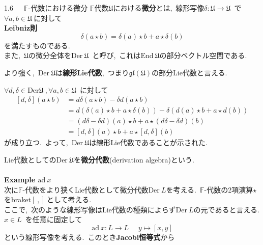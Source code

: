 \documentclass[uplatex,dvipdfmx]{jsarticle}
\begin{document}
\begin{mydef}{1.6~~~$\mathbb{F}$-代数における微分}
    $\mathbb{F}$代数$\mathfrak{U}$における\textbf{微分}とは,~線形写像$\delta:\mathfrak{U}\to \mathfrak{U}$~で$\forall a,b\in \mathfrak{U}~$に対して\\
    \textbf{Leibniz則}
    \begin{equation*}
        \delta(a\star b)=\delta(a)\star b+a\star \delta(b)
    \end{equation*}
    を満たすものである.\\
    また,~$\mathfrak{U}$の微分全体を$\text{Der}~\mathfrak{U}$~と呼び,~これは$\text{End}~\mathfrak{U}$の部分ベクトル空間である.
\end{mydef}
より強く,~$\text{Der}~\mathfrak{U}$は\textbf{線形Lie代数},~つまり$\mathfrak{gl}(\mathfrak{U})$の部分Lie代数と言える.\\
\begin{myproof}
$\forall d,\delta \in \text{Der}\mathfrak{U}~,\forall a,b\in \mathfrak{U}$~に対して
\begin{equation*}
    \begin{split}
        [d,\delta](a\star b)&=d\delta (a\star b)-\delta d(a\star b)\\
        &=d\left( \delta(a)\star b +a\star \delta (b)  \right)-\delta \left( d(a)\star b +a\star d (b)  \right)\\
        &=(d\delta -\delta d)(a)\star b+a\star(d\delta -\delta d)(b)\\
        &=[d,\delta ](a)\star b+a\star [d,\delta ](b)
    \end{split}
\end{equation*}
が成り立つ.~よって,~$\text{Der}~\mathfrak{U}$は線形Lie代数であることが示された.
\end{myproof}
Lie代数としての$\text{Der}~\mathfrak{U}$を\textbf{微分代数}(derivation algebra)という.\\\\
\textbf{Example $\text{ad}~x$}\\
次に$\mathbb{F}$-代数をより狭くLie代数として微分代数$\text{Der}~L$を考える.~$\mathbb{F}$-代数の2項演算$\star$をbraket$[~,]~$として考える.~\\
ここで,~次のような線形写像はLie代数の種類によらず$\text{Der}~L$の元であると言える.\\
$x\in L$~を任意に固定して
\begin{equation*}
    \text{ad}~x :L\to L ~~~~~~y\mapsto[x,y]
\end{equation*}
という線形写像を考える.~このとき\textbf{Jacobi恒等式}から
\end{document}
